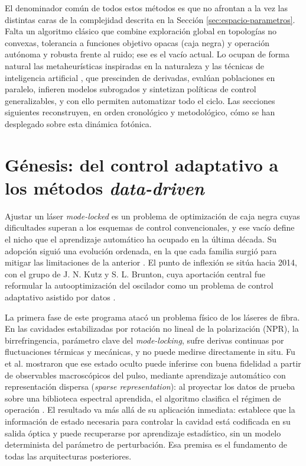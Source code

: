 El denominador común de todos estos métodos es que no afrontan a la vez las distintas caras de la complejidad descrita en la Sección \ref{sec:espacio-parametros}. Falta un algoritmo clásico que combine exploración global en topologías no convexas, tolerancia a funciones objetivo opacas (caja negra) y operación autónoma y robusta frente al ruido; ese es el vacío actual. Lo ocupan de forma natural las metaheurísticas inspiradas en la naturaleza y las técnicas de inteligencia artificial \cite{Genty2021,Pu2020}, que prescinden de derivadas, evalúan poblaciones en paralelo, infieren modelos subrogados y sintetizan políticas de control generalizables, y con ello permiten automatizar todo el ciclo. Las secciones siguientes reconstruyen, en orden cronológico y metodológico, cómo se han desplegado sobre esta dinámica fotónica.


\section{Génesis: del control adaptativo a los métodos \textit{data-driven}}
\label{sec:genesis-data-driven}

Ajustar un láser \emph{mode-locked} es un problema de optimización de caja negra cuyas dificultades superan a los esquemas de control convencionales, y ese vacío define el nicho que el aprendizaje automático ha ocupado en la última década. Su adopción siguió una evolución ordenada, en la que cada familia surgió para mitigar las limitaciones de la anterior \cite{Genty2021}. El punto de inflexión se sitúa hacia 2014, con el grupo de J. N. Kutz y S. L. Brunton, cuya aportación central fue reformular la autooptimización del oscilador como un problema de control adaptativo asistido por datos \cite{BruntonKutz2022}.

La primera fase de este programa atacó un problema físico de los láseres de fibra. En las cavidades estabilizadas por rotación no lineal de la polarización (NPR), la birrefringencia, parámetro clave del \emph{mode-locking}, sufre derivas continuas por fluctuaciones térmicas y mecánicas, y no puede medirse directamente in situ. Fu et al. mostraron que ese estado oculto puede inferirse con buena fidelidad a partir de observables macroscópicos del pulso, mediante aprendizaje automático con representación dispersa (\emph{sparse representation}): al proyectar los datos de prueba sobre una biblioteca espectral aprendida, el algoritmo clasifica el régimen de operación \cite{FuBruntonKutz2014}. El resultado va más allá de su aplicación inmediata: establece que la información de estado necesaria para controlar la cavidad está codificada en su salida óptica y puede recuperarse por aprendizaje estadístico, sin un modelo determinista del parámetro de perturbación. Esa premisa es el fundamento de todas las arquitecturas posteriores.

